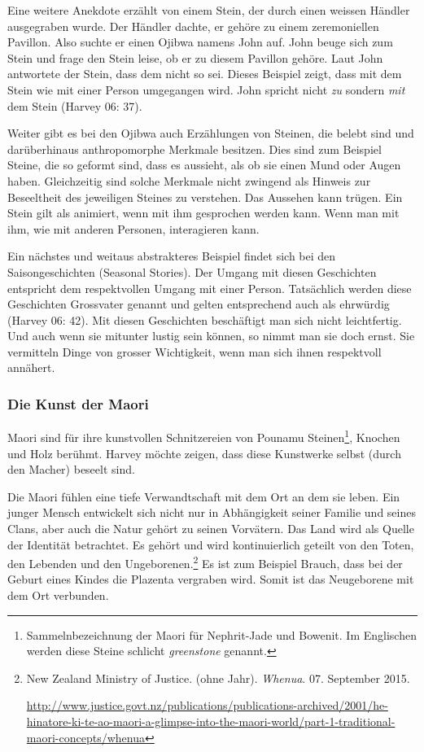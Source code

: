 Eine weitere Anekdote erzählt von einem Stein, der durch einen weissen Händler ausgegraben wurde. Der Händler dachte, er gehöre zu einem zeremoniellen Pavillon. Also suchte er einen Ojibwa namens John auf. John beuge sich zum Stein und frage den Stein leise, ob er zu diesem Pavillon gehöre. Laut John antwortete der Stein, dass dem nicht so sei. Dieses Beispiel zeigt, dass mit dem Stein wie mit einer Person umgegangen wird. John spricht nicht \emph{zu} sondern \emph{mit} dem Stein (Harvey 06: 37). 

Weiter gibt es bei den Ojibwa auch Erzählungen von Steinen, die belebt sind und darüberhinaus anthropomorphe Merkmale besitzen. Dies sind zum Beispiel Steine, die so geformt sind, dass es aussieht, als ob sie einen Mund oder Augen haben. Gleichzeitig sind solche Merkmale nicht zwingend als Hinweis zur Beseeltheit des jeweiligen Steines zu verstehen. Das Aussehen kann trügen. Ein Stein gilt als animiert, wenn mit ihm gesprochen werden kann. Wenn man mit ihm, wie mit anderen Personen, interagieren kann. 

Ein nächstes und weitaus abstrakteres Beispiel findet sich bei den Saison\-geschichten (Seasonal Stories). Der Umgang mit diesen Geschichten entspricht dem respektvollen Umgang mit einer Person. Tatsächlich werden diese Geschichten Grossvater genannt und gelten entsprechend auch als ehrwürdig (Harvey 06: 42). Mit diesen Geschichten beschäftigt man sich nicht leichtfertig. Und auch wenn sie mitunter lustig sein können, so nimmt man sie doch ernst. Sie vermitteln Dinge von grosser Wichtigkeit, wenn man sich ihnen respektvoll annähert. 

\subsubsection*{Die Kunst der Maori}
Maori sind für ihre kunstvollen Schnitzereien von Pounamu Steinen\footnote{Sammelnbezeichnung der Maori für Nephrit-Jade und Bowenit. Im Englischen werden diese Steine schlicht \emph{greenstone} genannt.}, Knochen und Holz berühmt. Harvey möchte zeigen, dass diese Kunstwerke selbst (durch den Macher) beseelt sind.

Die Maori fühlen eine tiefe Verwandtschaft mit dem Ort an dem sie leben. Ein junger Mensch entwickelt sich nicht nur in Abhängigkeit seiner Familie und seines Clans, aber auch die Natur gehört zu seinen Vorvätern. Das Land wird als Quelle der Identität betrachtet. Es gehört und wird kontinuierlich geteilt von den Toten, den Lebenden und den Ungeborenen.\footnote{New Zealand Ministry of Justice. (ohne Jahr). \emph{Whenua}. 07. September 2015.

	\url{http://www.justice.govt.nz/publications/publications-archived/2001/he-hinatore-ki-te-ao-maori-a-glimpse-into-the-maori-world/part-1-traditional-maori-concepts/whenua}}
Es ist zum Beispiel Brauch, dass bei der Geburt eines Kindes die Plazenta vergraben wird. Somit ist das Neugeborene mit dem Ort verbunden.

